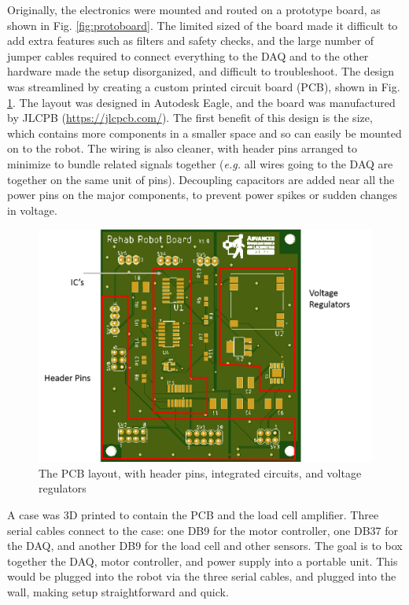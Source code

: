 \documentclass[12pt]{report}
\begin{document}
		Originally, the electronics were mounted and routed on a prototype board, as shown in Fig. \ref{fig:protoboard}. The limited sized of the board made it difficult to add extra features such as filters and safety checks, and the large number of jumper cables required to connect everything to the DAQ and to the other hardware made the setup disorganized, and difficult to troubleshoot. The design was streamlined by creating a custom printed circuit board (PCB), shown in Fig. \ref{fig:pcb_pic}. The layout was designed in Autodesk Eagle, and the board was manufactured by JLCPB (\url{https://jlcpcb.com/}). The first benefit of this design is the size, which contains more components in a smaller space and so can easily be mounted on to the robot. The wiring is also cleaner, with header pins arranged to minimize to bundle related signals together (\textit{e.g.} all wires going to the DAQ are together on the same unit of pins). Decoupling capacitors are added near all the power pins on the major components, to prevent power spikes or sudden changes in voltage.
		
		\begin{figure}[h] 
		\centering
		\includegraphics[width=0.9\linewidth]{pcb_pic2}
		\caption{The PCB layout, with header pins, integrated circuits, and voltage regulators}
		\label{fig:pcb_pic}
	\end{figure}
	
		
		
		A case was 3D printed to contain the PCB and the load cell amplifier. Three serial cables connect to the case: one DB9 for the motor controller, one DB37 for the DAQ, and another DB9 for the load cell and other sensors. The goal is to box together the DAQ, motor controller, and power supply into a portable unit. This would be plugged into the robot via the three serial cables, and plugged into the wall, making setup straightforward and quick. 
		
\end{document}

